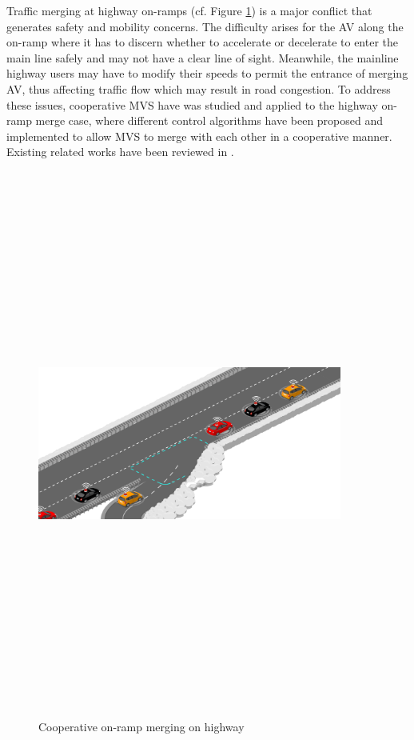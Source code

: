Traffic merging at highway on-ramps (cf. Figure \ref{fig:OnRamp}) is a major conflict that generates safety and mobility concerns. The difficulty arises for the AV along the on-ramp where it has to discern whether to accelerate or decelerate to enter the main line safely and may not have a clear line of sight. Meanwhile, the mainline highway users may have to modify their speeds to permit the entrance of merging AV, thus affecting traffic flow which may result in road congestion. To address these issues, cooperative MVS have was studied and applied to the highway on-ramp merge case, where different control algorithms have been proposed and implemented to allow MVS to merge with each other in a cooperative manner. Existing related works have been reviewed in \cite{7562449}. 

 
 
 
 \begin{figure}[!h]
        \centering 
        \includegraphics[width=10cm,height=18cm,keepaspectratio]{chapters/Chapitre_2/Figures/OnRamp.png}
        \caption{Cooperative on-ramp merging on highway}
        \label{fig:OnRamp}
        \end{figure}
 
